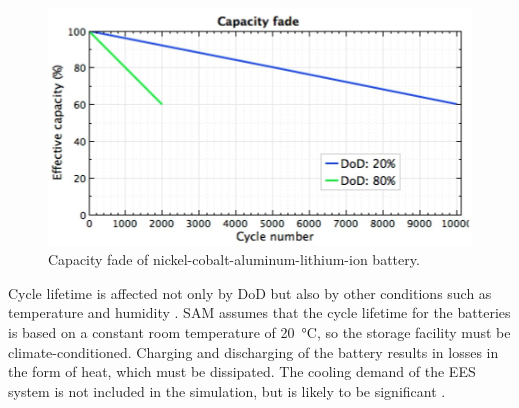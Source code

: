 \begin{figure}[bhtp]  
\centering
\includegraphics[width=0.75\linewidth]{FIG/CapacityFade}
\caption[Capacity fade of nickel-cobalt-aluminum-lithium-ion battery.]{Capacity fade of nickel-cobalt-aluminum-lithium-ion battery.}\label{CapacityFade}
\end{figure}


Cycle lifetime is affected not only by DoD but also by other conditions such as temperature and humidity \cite{MitElectricVehilceTeam2008}. SAM assumes that the cycle lifetime for the batteries is based on a constant room temperature of \SI{20}{\celsius}, so the storage facility must be climate-conditioned. Charging and discharging of the battery results in losses in the form of heat, which must be dissipated. The cooling demand of the EES system is not included in the simulation, but is likely to be significant \cite{Diorio2015}.


